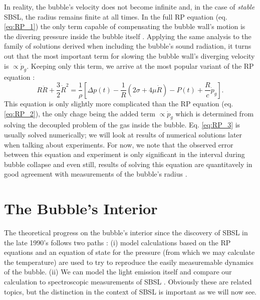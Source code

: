 \documentclass[rmp,aps,nofootinbib,superscriptaddress,floatfix]{revtex4-2}
\begin{document}
In reality, the bubble's velocity does not become infinite and, in the case of \emph{stable} SBSL, the radius remains finite at all times. In the full RP equation (eq. \ref{eq:RP_1}) the only term capable of compensating the bubble wall's motion is the divering pressure inside the bubble itself \cite{brenner2002single}. Applying the same analysis to the family of solutions derived when including the bubble's sound radiation, it turns out that the most important term for slowing the bubble wall's diverging velocity is $\propto\dot{p}_g$. Keeping only this term, we arrive at the most popular variant of the RP equation \cite{lofstedt1995sonoluminescing,barber1997defining}:
\begin{equation}
    R\ddot{R}+\frac{3}{2}\dot{R}^2 = \frac{1}{\rho} \left[ \Delta p(t)-\frac{1}{R}\left( 2\sigma+4\mu \dot{R} \right)-P(t) +\frac{R}{c} \dot{p}_g \right].
    \label{eq:RP_3}
\end{equation}
This equation is only slightly more complicated than the RP equation (eq. \ref{eq:RP_2}), the only chage being the added term $\propto \dot{p}_g$ which is determined from solving the decoupled problem of the gas inside the bubble. Eq. \ref{eq:RP_3} is usually solved numerically; we will look at results of numerical solutions later when talking about experiments. For now, we note that the observed error between this equation and experiment is only significant in the interval during bubble collapse and even still, results of solving this equation are quantitavely in good agreement with measurements of the bubble's radius \cite{brenner2002single}. 


\section{The Bubble's Interior}

The theoretical progress on the bubble's interior since the discovery of SBSL in the late 1990's \cite{gaitan1992sonoluminescence} follows two paths \cite{brenner2002single,suslick2008inside,yasui2018acoustic}: (i) model calculations based on the RP equations and an equation of state for the pressure (from which we may calculate the temperature) are used to try to reproduce the easily measuremable dynamics of the bubble. (ii) We can model the light emission itself and compare our calculation to spectroscopic measurements of SBSL \cite{}. Obviously these are related topics, but the distinction in the context of SBSL is important as we will now see.
\end{document}
